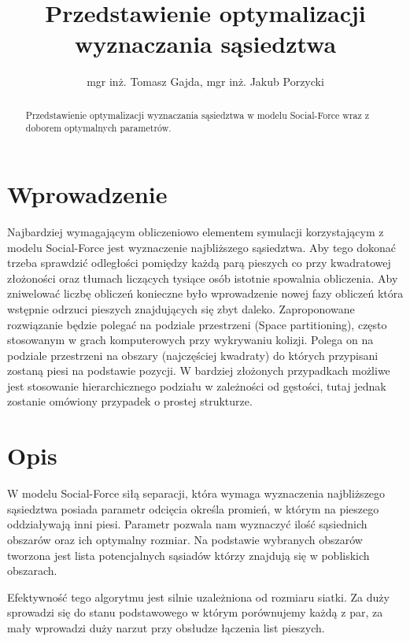 \documentclass{article}
\begin{document}
\title{Przedstawienie optymalizacji wyznaczania sąsiedztwa}
\author{mgr inż. Tomasz Gajda, mgr inż. Jakub Porzycki}

\maketitle

\begin{abstract}
Przedstawienie optymalizacji wyznaczania sąsiedztwa w modelu Social-Force wraz z doborem optymalnych parametrów.

\end{abstract}


\section{Wprowadzenie}

Najbardziej wymagającym obliczeniowo elementem symulacji korzystającym z modelu Social-Force jest wyznaczenie najbliższego sąsiedztwa. Aby tego dokonać trzeba sprawdzić odległości pomiędzy każdą parą pieszych co przy kwadratowej złożoności oraz tłumach liczących tysiące osób istotnie spowalnia obliczenia.
Aby zniwelować liczbę obliczeń konieczne było wprowadzenie nowej fazy obliczeń która wstępnie odrzuci pieszych znajdujących się zbyt daleko. 
Zaproponowane rozwiązanie będzie polegać na podziale przestrzeni (Space partitioning), często stosowanym w grach komputerowych przy wykrywaniu kolizji. Polega on na podziale przestrzeni na obszary (najczęściej kwadraty) do których przypisani zostaną piesi na podstawie pozycji. W bardziej złożonych przypadkach możliwe jest stosowanie hierarchicznego podziału w zależności od gęstości, tutaj jednak zostanie omówiony przypadek o prostej strukturze.  

\section{Opis}
W modelu Social-Force siłą separacji, która wymaga wyznaczenia najbliższego sąsiedztwa posiada parametr odcięcia określa promień, w którym na pieszego oddziaływają inni piesi. Parametr pozwala nam wyznaczyć ilość sąsiednich obszarów oraz ich optymalny rozmiar. Na podstawie wybranych obszarów tworzona jest lista potencjalnych sąsiadów którzy znajdują się w pobliskich obszarach.

Efektywność tego algorytmu jest silnie uzależniona od rozmiaru siatki. Za duży sprowadzi się do stanu podstawowego w którym porównujemy każdą z par, za mały wprowadzi duży narzut przy obsłudze łączenia list pieszych.
\end{document}
